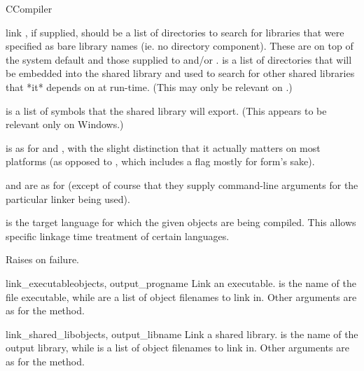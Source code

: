\documentclass{manual}
\begin{document}
\begin{classdesc}{CCompiler}{}
\begin{methoddesc}{link}
, if supplied, should be a list of directories to
search for libraries that were specified as bare library names
(ie. no directory component).  These are on top of the system
default and those supplied to  and/or
.   is a list of
directories that will be embedded into the shared library and used
to search for other shared libraries that *it* depends on at
run-time.  (This may only be relevant on \UNIX.)

 is a list of symbols that the shared library will
export.  (This appears to be relevant only on Windows.)

 is as for  and , 
with the slight distinction that it actually matters on most platforms (as
opposed to , which includes a  flag
mostly for form's sake).

 and  are as for  
(except of course that they supply command-line arguments for the
particular linker being used).

 is the target language for which the given objects
are being compiled. This allows specific linkage time treatment of
certain languages.

Raises  on failure.
\end{methoddesc}

\begin{methoddesc}{link_executable}{objects, output_progname}
Link an executable. 
 is the name of the file executable,
while  are a list of object filenames to link in. Other arguments 
are as for the  method. 
\end{methoddesc}

\begin{methoddesc}{link_shared_lib}{objects, output_libname}
Link a shared library.  is the name of the output 
library, while  is a list of object filenames to link in. 
Other arguments are as for the  method. 
\end{methoddesc}


\end{classdesc}
\end{document}
